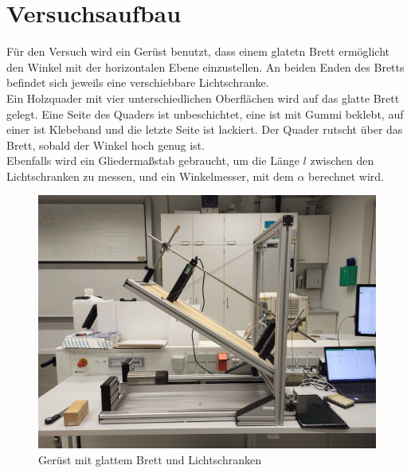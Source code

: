 \section{Versuchsaufbau}

Für den Versuch wird ein Gerüst benutzt, dass einem glatetn Brett ermöglicht den Winkel mit der horizontalen Ebene einzustellen. An beiden Enden des Bretts befindet sich jeweils eine verschiebbare Lichtschranke.\\
Ein Holzquader mit vier unterschiedlichen Oberflächen wird auf das glatte Brett gelegt. Eine Seite des Quaders ist unbeschichtet, eine ist mit Gummi beklebt, auf einer ist Klebeband und die letzte Seite ist lackiert. Der Quader rutscht über das Brett, sobald der Winkel hoch genug ist.\\
Ebenfalls wird ein Gliedermaßstab gebraucht, um die Länge $l$ zwischen den Lichtschranken zu messen, und ein Winkelmesser, mit dem $\alpha$ berechnet wird.
\begin{figure}[ht]
    \centering
    \includegraphics[width=\linewidth/2]{images/Versuch-Aufbau.jpg}
    \caption[Aufbau]{Gerüst mit glattem Brett und Lichtschranken}
    \label{fig:Aufbau}
\end{figure}